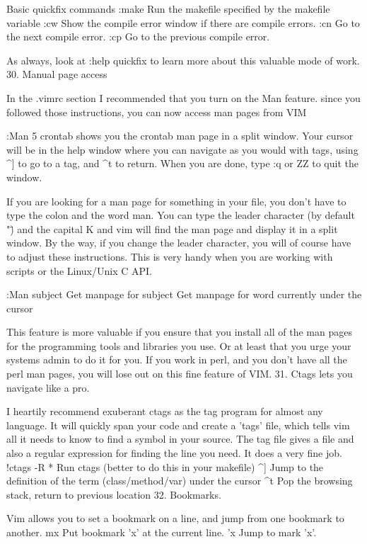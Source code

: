 \documentclass[a4paper, 12pt]{article}
\begin{document}
      Basic quickfix commands
      :make	Run the makefile specified by the makefile variable
      :cw	Show the compile error window if there are compile errors.
      :cn	Go to the next compile error.
      :cp	Go to the previous compile error.

      As always, look at :help quickfix to learn more about this valuable mode of work.
  30. Manual page access

      In the .vimrc section I recommended that you turn on the Man feature. since you followed those instructions, you can now access man pages from VIM

      :Man 5 crontab shows you the crontab man page in a split window. Your cursor will be in the help window where you can navigate as you would with tags, using ^] to go to a tag, and ^t to return. When you are done, type :q or ZZ to quit the window.

      If you are looking for a man page for something in your file, you don't have to type the colon and the word man. You can type the leader character (by default "\") and the capital K and vim will find the man page and display it in a split window. By the way, if you change the leader character, you will of course have to adjust these instructions. This is very handy when you are working with scripts or the Linux/Unix C API.

      :Man subject	Get manpage for subject
      \K	Get manpage for word currently under the cursor

      This feature is more valuable if you ensure that you install all of the man pages for the programming tools and libraries you use. Or at least that you urge your systems admin to do it for you. If you work in perl, and you don't have all the perl man pages, you will lose out on this fine feature of VIM.
  31. Ctags lets you navigate like a pro.

      I heartily recommend exuberant ctags as the tag program for almost any language. It will quickly span your code and create a 'tags' file, which tells vim all it needs to know to find a symbol in your source. The tag file gives a file and also a regular expression for finding the line you need. It does a very fine job.
      !ctags -R *	Run ctags (better to do this in your makefile)
      ^]	Jump to the definition of the term (class/method/var) under the cursor
      ^t	Pop the browsing stack, return to previous location
  32. Bookmarks.

      Vim allows you to set a bookmark on a line, and jump from one bookmark to another.
      mx	Put bookmark 'x' at the current line.
      'x	Jump to mark 'x'.
\end{document}
